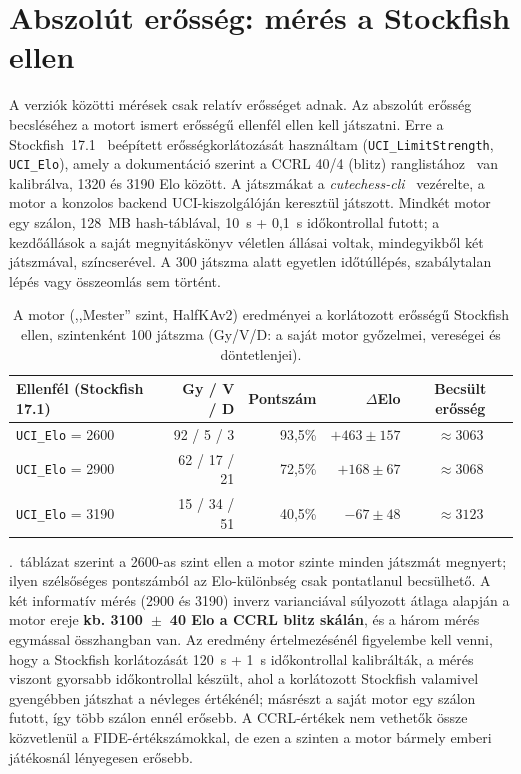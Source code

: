 

\section{Abszolút erősség: mérés a Stockfish ellen}\label{sec:stockfish}

A verziók közötti mérések csak relatív erősséget adnak. Az abszolút erősség becsléséhez a motort ismert erősségű ellenfél ellen kell játszatni. Erre a Stockfish~17.1~\cite{Stockfish} beépített erősségkorlátozását használtam (\texttt{UCI\_LimitStrength}, \texttt{UCI\_Elo}), amely a dokumentáció szerint a CCRL 40/4 (blitz) ranglistához~\cite{CCRL} van kalibrálva, 1320 és 3190 Elo között. A játszmákat a \emph{cutechess-cli}~\cite{CuteChess} vezérelte, a motor a konzolos backend UCI-kiszolgálóján keresztül játszott. Mindkét motor egy szálon, 128~MB hash-táblával, 10~s + 0,1~s időkontrollal futott; a kezdőállások a saját megnyitáskönyv véletlen állásai voltak, mindegyikből két játszmával, színcserével. A 300 játszma alatt egyetlen időtúllépés, szabálytalan lépés vagy összeomlás sem történt.

\begin{table}[!ht]
	\footnotesize
	\centering
	\begin{tabular}{l r r r c}
		\toprule
		Ellenfél (Stockfish 17.1) & Gy / V / D & Pontszám & $\Delta$Elo & Becsült erősség \\
		\midrule
		\texttt{UCI\_Elo} = 2600 & 92 / 5 / 3 & 93,5\% & $+463 \pm 157$ & $\approx 3063$ \\
		\texttt{UCI\_Elo} = 2900 & 62 / 17 / 21 & 72,5\% & $+168 \pm 67$ & $\approx 3068$ \\
		\texttt{UCI\_Elo} = 3190 & 15 / 34 / 51 & 40,5\% & $-67 \pm 48$ & $\approx 3123$ \\
		\bottomrule
	\end{tabular}
	\caption{A motor (,,Mester'' szint, HalfKAv2) eredményei a korlátozott erősségű Stockfish ellen, szintenként 100 játszma (Gy/V/D: a saját motor győzelmei, vereségei és döntetlenjei).}
	\label{tab:stockfish}
\end{table}

.~táblázat szerint a 2600-as szint ellen a motor szinte minden játszmát megnyert; ilyen szélsőséges pontszámból az Elo-különbség csak pontatlanul becsülhető. A két informatív mérés (2900 és 3190) inverz varianciával súlyozott átlaga alapján a motor ereje \textbf{kb. 3100~$\pm$~40 Elo a CCRL blitz skálán}, és a három mérés egymással összhangban van. Az eredmény értelmezésénél figyelembe kell venni, hogy a Stockfish korlátozását 120~s + 1~s időkontrollal kalibrálták, a mérés viszont gyorsabb időkontrollal készült, ahol a korlátozott Stockfish valamivel gyengébben játszhat a névleges értékénél; másrészt a saját motor egy szálon futott, így több szálon ennél erősebb. A CCRL-értékek nem vethetők össze közvetlenül a FIDE-értékszámokkal, de ezen a szinten a motor bármely emberi játékosnál lényegesen erősebb.

